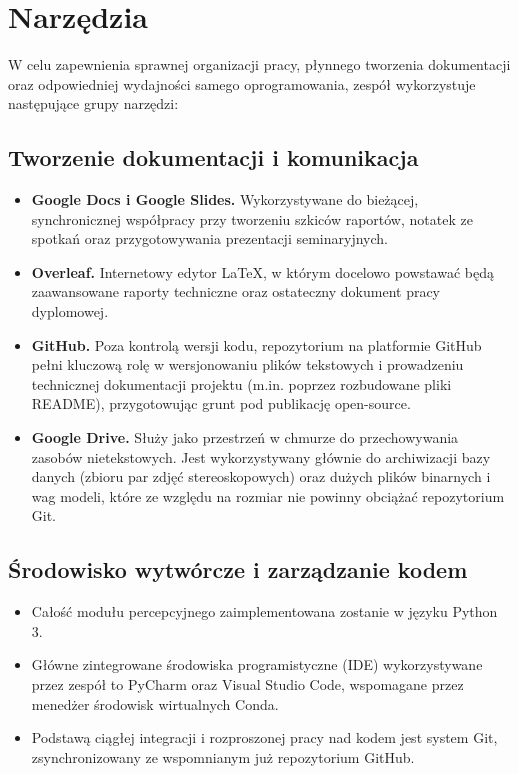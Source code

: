 \documentclass[11pt, a4paper]{article}
\begin{document}
\section{Narzędzia}
W celu zapewnienia sprawnej organizacji pracy, płynnego tworzenia dokumentacji oraz odpowiedniej wydajności samego oprogramowania, zespół wykorzystuje następujące grupy narzędzi:

\subsection{Tworzenie dokumentacji i komunikacja}
\begin{itemize}
    \item \textbf{Google Docs i Google Slides.} Wykorzystywane do bieżącej, synchronicznej współpracy przy tworzeniu szkiców raportów, notatek ze spotkań oraz przygotowywania prezentacji seminaryjnych.
    \item \textbf{Overleaf.} Internetowy edytor LaTeX, w którym docelowo powstawać będą zaawansowane raporty techniczne oraz ostateczny dokument pracy dyplomowej.
    \item \textbf{GitHub.} Poza kontrolą wersji kodu, repozytorium na platformie GitHub pełni kluczową rolę w wersjonowaniu plików tekstowych i prowadzeniu technicznej dokumentacji projektu (m.in. poprzez rozbudowane pliki README), przygotowując grunt pod publikację open-source.
    \item \textbf{Google Drive.} Służy jako przestrzeń w chmurze do przechowywania zasobów nietekstowych. Jest wykorzystywany głównie do archiwizacji bazy danych (zbioru par zdjęć stereoskopowych) oraz dużych plików binarnych i wag modeli, które ze względu na rozmiar nie powinny obciążać repozytorium Git.
\end{itemize}

\subsection{Środowisko wytwórcze i zarządzanie kodem}
\begin{itemize}
    \item Całość modułu percepcyjnego zaimplementowana zostanie w języku Python 3.
    \item Główne zintegrowane środowiska programistyczne (IDE) wykorzystywane przez zespół to PyCharm oraz Visual Studio Code, wspomagane przez menedżer środowisk wirtualnych Conda.
    \item Podstawą ciągłej integracji i rozproszonej pracy nad kodem jest system Git, zsynchronizowany ze wspomnianym już repozytorium GitHub.
\end{itemize}
\end{document}
